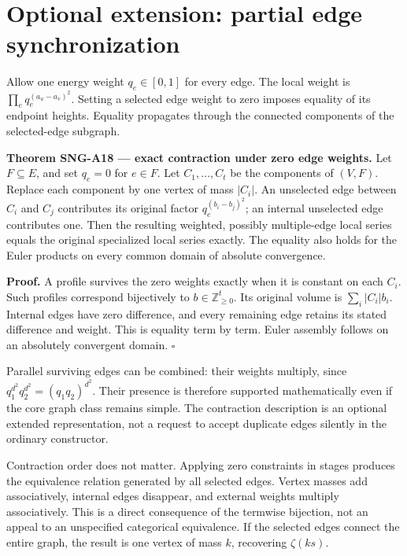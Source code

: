 \documentclass[
  11pt,
  a4paper,
]{report}
\begin{document}
\hypertarget{optional-extension-partial-edge-synchronization}{%
\section{Optional extension: partial edge
synchronization}\label{optional-extension-partial-edge-synchronization}}

Allow one energy weight \(q_e\in[0,1]\) for every edge. The local weight
is \(\prod_eq_e^{(a_u-a_v)^2}\). Setting a selected edge weight to zero
imposes equality of its endpoint heights. Equality propagates through
the connected components of the selected-edge subgraph.

\textbf{Theorem SNG-A18 --- exact contraction under zero edge weights.}
Let \(F\subseteq E\), and set \(q_e=0\) for \(e\in F\). Let
\(C_1,\ldots,C_t\) be the components of \((V,F)\). Replace each
component by one vertex of mass \(|C_i|\). An unselected edge between
\(C_i\) and \(C_j\) contributes its original factor
\(q_e^{(b_i-b_j)^2}\); an internal unselected edge contributes one. Then
the resulting weighted, possibly multiple-edge local series equals the
original specialized local series exactly. The equality also holds for
the Euler products on every common domain of absolute convergence.

\textbf{Proof.} A profile survives the zero weights exactly when it is
constant on each \(C_i\). Such profiles correspond bijectively to
\(b\in\mathbb Z_{\ge0}^t\). Its original volume is \(\sum_i|C_i|b_i\).
Internal edges have zero difference, and every remaining edge retains
its stated difference and weight. This is equality term by term. Euler
assembly follows on an absolutely convergent domain. \(\square\)

Parallel surviving edges can be combined: their weights multiply, since
\(q_1^{d^2}q_2^{d^2}=(q_1q_2)^{d^2}\). Their presence is therefore
supported mathematically even if the core graph class remains simple.
The contraction description is an optional extended representation, not
a request to accept duplicate edges silently in the ordinary
constructor.

Contraction order does not matter. Applying zero constraints in stages
produces the equivalence relation generated by all selected edges.
Vertex masses add associatively, internal edges disappear, and external
weights multiply associatively. This is a direct consequence of the
termwise bijection, not an appeal to an unspecified categorical
equivalence. If the selected edges connect the entire graph, the result
is one vertex of mass \(k\), recovering \(\zeta(ks)\).
\end{document}
